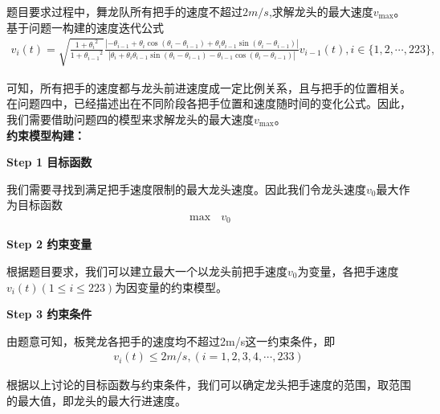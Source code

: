 \documentclass[../main.tex]{subfiles}
\begin{document}
\par 题目要求过程中，舞龙队所有把手的速度不超过$2m/s$,求解龙头的最大速度$v_{\max}$。
基于问题一构建的速度迭代公式
\begin{align}\label{1.........666}
v_i(t) = \sqrt{\frac{1 + {\theta _i}^2}{1 + {\theta _{i - 1}}^2}}\frac{|-\theta _{i - 1}+\theta _i\cos(\theta _{i }-\theta _{i-1})+\theta _i\theta _{i - 1}\sin(\theta _{i }-\theta _{i-1})|}{|\theta _i+\theta _i\theta _{i - 1}\sin(\theta _i -\theta _{i-1})-\theta _{i - 1}\cos(\theta _i -\theta _{i-1})|}v_{i - 1}(t), i\in \{1, 2, \cdots, 223\},
\end{align}
\par 可知，所有把手的速度都与龙头前进速度成一定比例关系，且与把手的位置相关。在问题四中，已经描述出在不同阶段各把手位置和速度随时间的变化公式。因此，我们需要借助问题四的模型来求解龙头的最大速度$v_{\max}$。
\\\noindent\textbf{ 约束模型构建：}
\par \textbf{Step 1 目标函数}
\par 我们需要寻找到满足把手速度限制的最大龙头速度。因此我们令龙头速度$v_0$最大作为目标函数
\begin{align}\label{1...23.3.4}
\max\text{\ }v_0
\end{align}
\par \textbf{Step 2 约束变量}
\par 根据题目要求，我们可以建立最大一个以龙头前把手速度$v_0$为变量，各把手速度$v_i\left( t \right) \left( 1\le i\le 223 \right) $为因变量的约束模型。
\par \textbf{Step 3 约束条件} 
\par 由题意可知，板凳龙各把手的速度均不超过2m/s这一约束条件，即 
\begin{align}\label{1.........462}
v_i\left( t \right) \le 2m/s,\left(  \right. i=1,2,3,4,\cdots ,233\left.  \right) 
\end{align}
\par 根据以上讨论的目标函数与约束条件，我们可以确定龙头把手速度的范围，取范围的最大值，即龙头的最大行进速度。
\end{document}
